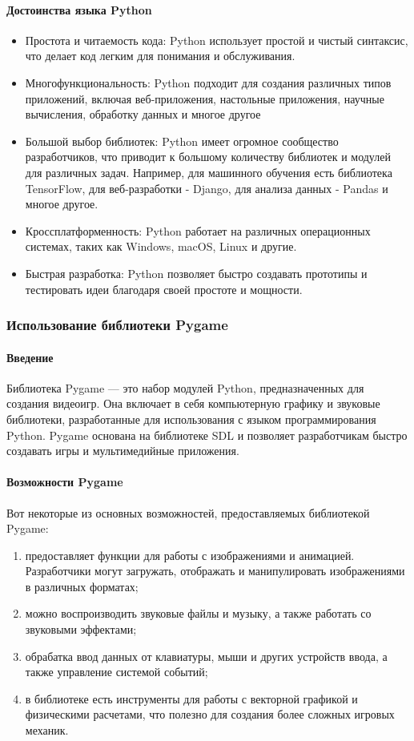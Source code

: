 \paragraph{Достоинства языка Python}
\begin{itemize}
	\item Простота и читаемость кода: Python использует простой и чистый синтаксис, что делает код легким для понимания и обслуживания.
	\item Многофункциональность: Python подходит для создания различных типов приложений, включая веб-приложения, настольные приложения, научные вычисления, обработку данных и многое другое
	\item Большой выбор библиотек: Python имеет огромное сообщество разработчиков, что приводит к большому количеству библиотек и модулей для различных задач. Например, для машинного обучения есть библиотека TensorFlow, для веб-разработки - Django, для анализа данных - Pandas и многое другое.
	\item Кроссплатформенность: Python работает на различных операционных системах, таких как Windows, macOS, Linux и другие.
	\item Быстрая разработка: Python позволяет быстро создавать прототипы и тестировать идеи благодаря своей простоте и мощности.
\end{itemize}



\subsubsection{Использование библиотеки Pygame}

\paragraph{Введение}
Библиотека Pygame — это набор модулей Python, предназначенных для создания видеоигр. Она включает в себя компьютерную графику и звуковые библиотеки, разработанные для использования с языком программирования Python. Pygame основана на библиотеке SDL и позволяет разработчикам быстро создавать игры и мультимедийные приложения.

\paragraph{Возможности Pygame}
Вот некоторые из основных возможностей, предоставляемых библиотекой Pygame:

\begin{enumerate}
		\item предоставляет функции для работы с изображениями и анимацией. Разработчики могут загружать, отображать и манипулировать изображениями в различных форматах;
		\item можно воспроизводить звуковые файлы и музыку, а также работать со звуковыми эффектами;
		\item обрабатка ввод данных от клавиатуры, мыши и других устройств ввода, а также управление системой событий;
		\item в библиотеке есть инструменты для работы с векторной графикой и физическими расчетами, что полезно для создания более сложных игровых механик.
\end{enumerate}

